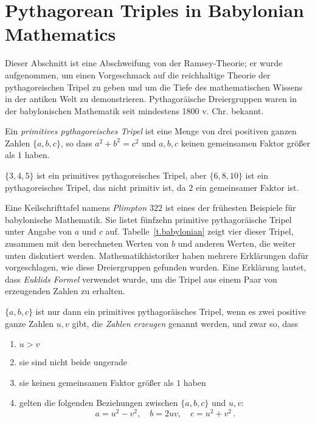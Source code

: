 
\section{Pythagorean Triples in Babylonian Mathematics}\label{s.plimpton}

Dieser Abschnitt ist eine Abschweifung von der Ramsey-Theorie; er wurde aufgenommen, um einen Vorgeschmack auf die reichhaltige Theorie der pythagoreischen Tripel zu geben und um die Tiefe des mathematischen Wissens in der antiken Welt zu demonstrieren. Pythagoräische Dreiergruppen waren in der babylonischen Mathematik seit mindestens 1800 v. Chr. bekannt.
\begin{definition}
Ein \emph{primitives pythagoreisches Tripel} ist eine Menge von drei positiven ganzen Zahlen $\{a,b,c\}$, so dass $a^2+b^2=c^2$ und $a,b,c$ keinen gemeinsamen Faktor größer als $1$ haben.
\end{definition}
\begin{example}
$\{3,4,5\}$ ist ein primitives pythagoreisches Tripel, aber $\{6,8,10\}$ ist ein pythagoreisches Tripel, das nicht primitiv ist, da $2$ ein gemeinsamer Faktor ist.
\end{example}
Eine Keilschrifttafel namens \emph{Plimpton $322$} ist eines der frühesten Beispiele für babylonische Mathematik. Sie listet fünfzehn primitive pythagoräische Tripel unter Angabe von $a$ und $c$ auf. Tabelle~\ref{t.babylonian} zeigt vier dieser Tripel, zusammen mit den berechneten Werten von $b$ und anderen Werten, die weiter unten diskutiert werden. Mathematikhistoriker haben mehrere Erklärungen dafür vorgeschlagen, wie diese Dreiergruppen gefunden wurden. Eine Erklärung lautet, dass \emph{Euklids Formel} verwendet wurde, um die Tripel aus einem Paar von erzeugenden Zahlen zu erhalten.
\begin{theorem}[Euclid]
$\{a,b,c\}$ ist nur dann ein primitives pythagoräisches Tripel, wenn es zwei positive ganze Zahlen $u,v$ gibt, die \emph{Zahlen erzeugen} genannt werden, und zwar so, dass\label{thm.euclid-function}
\begin{enumerate}
\item $u>v$
\item sie sind nicht beide ungerade
\item sie keinen gemeinsamen Faktor größer als $1$ haben
\item gelten die folgenden Beziehungen zwischen $\{a,b,c\}$ und $u,v$:
\[
a=u^2-v^2,\quad b=2uv,\quad c=u^2+v^2\,.
\]
\end{enumerate}
\end{theorem}

